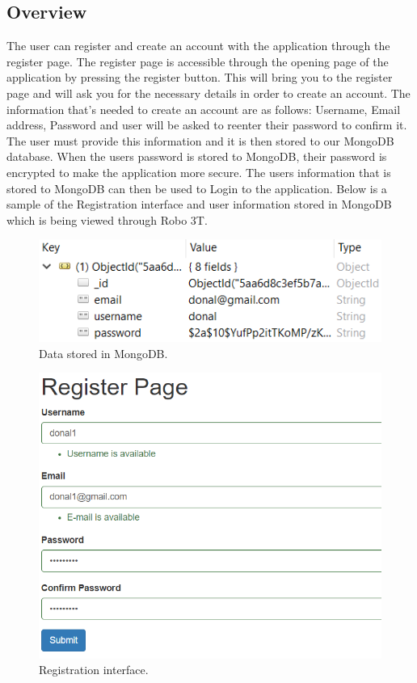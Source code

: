 \subsection{Overview}
The user can register and create an account with the application through the register page. The register page is accessible through the opening page of the application by pressing the register button. This will bring you to the register page and will ask you for the necessary details in order to create an account. The information that's needed to create an account are as follows:
Username, Email address, Password and user will be asked to reenter their password to confirm it. The user must provide this information and it is then stored to our MongoDB database. When the users password is stored to MongoDB, their password is encrypted to make the application more secure. The users information that is stored to MongoDB can then be used to Login to the application. Below is a sample of the Registration interface and user information stored in MongoDB which is being viewed through Robo 3T.
\begin{figure}[H]
\centering
\includegraphics[]{img/UserInfo.png}
\caption{Data stored in MongoDB.}
\end{figure}

\begin{figure}[H]
\centering
\includegraphics[]{img/UserInterface.png}
\caption{Registration interface.}
\end{figure}


